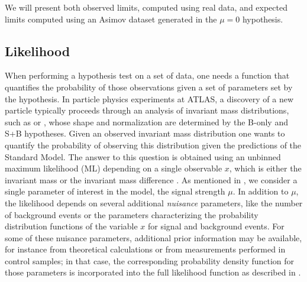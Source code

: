 We will present both observed limits, computed using real data, and expected limits
computed using an Asimov dataset generated in the $\mu=0$ hypothesis.

\subsection{Likelihood}
\label{subsec:likelihood}
When performing a hypothesis test on a set of data, one needs a function that 
quantifies the probability of those observations given a set of parameters
set by the hypothesis. In particle physics experiments at ATLAS, a discovery
of a new particle typically proceeds through an analysis of 
invariant mass distributions, such as \dm or \mllg, whose shape and normalization 
are determined by the B-only and S+B hypotheses. 
Given an observed invariant mass distribution one wants
to quantify the probability of observing this distribution given the predictions of 
the Standard Model. The answer to this question is obtained using an 
unbinned maximum likelihood (ML) depending on a single observable $x$, which
is either the invariant mass \mllg or the invariant mass difference \dm. As
mentioned in , we consider a single parameter of interest
in the model, the signal strength $\mu$. In addition to $\mu$, the likelihood
depends on several additional \emph{nuisance} parameters, like the number of
background events or the parameters characterizing the probability distribution
functions of the variable $x$ for signal and background events. For some of
these nuisance parameters, additional prior information may be available, for 
instance from theoretical calculations or from measurements performed in control
samples; in that case, the corresponding probability density function for those
parameters is incorporated into the full likelihood function as described in
.

